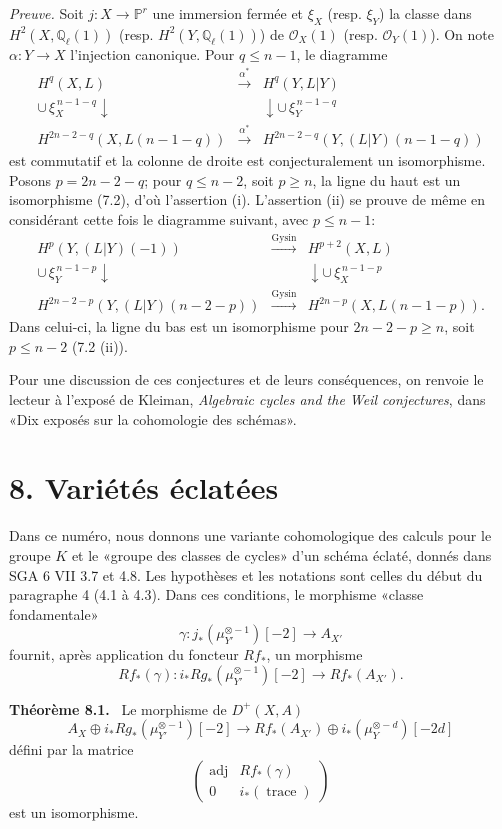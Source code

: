 \documentclass[11pt]{article}
\newenvironment{statement}[1]{\par\medskip\noindent\textbf{#1.}\ }{\par\medskip}
\begin{document}
\emph{Preuve.} Soit $j:X\to\mathbb P^r$ une immersion fermée et $\xi_X$ (resp. $\xi_Y$) la classe dans $H^2(X,\mathbb Q_\ell(1))$ (resp. $H^2(Y,\mathbb Q_\ell(1))$) de $\mathcal O_X(1)$ (resp. $\mathcal O_Y(1)$). On note $\alpha:Y\to X$ l'injection canonique. Pour $q\le n-1$, le diagramme
\[
\begin{array}{ccc}
H^q(X,L)&\xrightarrow{\alpha^*}&H^q(Y,L|Y)\\
\cup\,\xi_X^{\,n-1-q}\downarrow&&\downarrow\cup\,\xi_Y^{\,n-1-q}\\
H^{2n-2-q}(X,L(n-1-q))&\xrightarrow{\alpha^*}&
H^{2n-2-q}(Y,(L|Y)(n-1-q))
\end{array}
\]
est commutatif et la colonne de droite est conjecturalement un isomorphisme. Posons $p=2n-2-q$; pour $q\le n-2$, soit $p\ge n$, la ligne du haut est un isomorphisme (7.2), d'où l'assertion (i). L'assertion (ii) se prouve de même en considérant cette fois le diagramme suivant, avec $p\le n-1$:
\[
\begin{array}{ccc}
H^p(Y,(L|Y)(-1))&\xrightarrow{\mathrm{Gysin}}&H^{p+2}(X,L)\\
\cup\,\xi_Y^{\,n-1-p}\downarrow&&\downarrow\cup\,\xi_X^{\,n-1-p}\\
H^{2n-2-p}(Y,(L|Y)(n-2-p))&\xrightarrow{\mathrm{Gysin}}&
H^{2n-p}(X,L(n-1-p)).
\end{array}
\]
Dans celui-ci, la ligne du bas est un isomorphisme pour $2n-2-p\ge n$, soit $p\le n-2$ (7.2 (ii)).

Pour une discussion de ces conjectures et de leurs conséquences, on renvoie le lecteur à l'exposé de Kleiman, \emph{Algebraic cycles and the Weil conjectures}, dans «Dix exposés sur la cohomologie des schémas».

\section*{8. Variétés éclatées}

Dans ce numéro, nous donnons une variante cohomologique des calculs pour le groupe $K$ et le «groupe des classes de cycles» d'un schéma éclaté, donnés dans SGA 6 VII 3.7 et 4.8. Les hypothèses et les notations sont celles du début du paragraphe 4 (4.1 à 4.3). Dans ces conditions, le morphisme «classe fondamentale»
\[
\gamma:j_*(\mu_{Y'}^{\otimes -1})[-2]\to A_{X'}
\]
fournit, après application du foncteur $Rf_*$, un morphisme
\[
Rf_*(\gamma):i_*Rg_*(\mu_{Y'}^{\otimes -1})[-2]\to Rf_*(A_{X'}).
\]

\begin{statement}{Théorème 8.1}
Le morphisme de $D^+(X,A)$
\[
A_X\oplus i_*Rg_*(\mu_{Y'}^{\otimes -1})[-2]\to
Rf_*(A_{X'})\oplus i_*(\mu_Y^{\otimes -d})[-2d]
\tag{8.1.1}
\]
défini par la matrice
\[
\begin{pmatrix}
\operatorname{adj}&Rf_*(\gamma)\\
0&i_*(\operatorname{trace})
\end{pmatrix}
\]
est un isomorphisme.
\end{statement}
\end{document}
